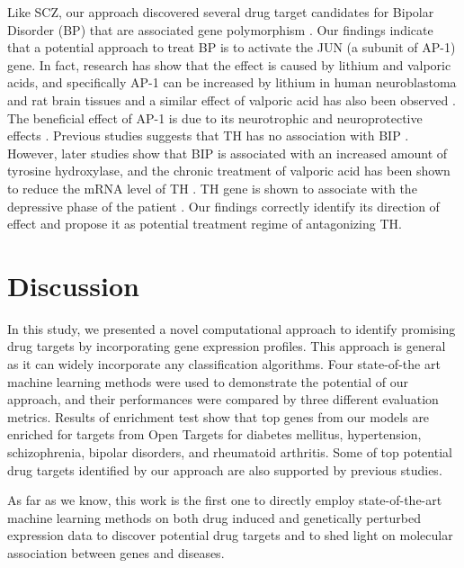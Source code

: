     Like SCZ, our approach discovered several drug target candidates for Bipolar Disorder (BP) that are associated gene polymorphism \cite{lee2013pathway,zhang2015functional,golimbet2014study}. Our findings indicate that a potential approach to treat BP is to activate the JUN (a subunit of AP-1) gene. In fact, research has show that the effect is caused by lithium and valporic acids, and specifically AP-1 can be increased by lithium in human neuroblastoma and rat brain tissues and a similar effect of valporic acid has also been observed \cite{yuan1998lithium,asghari1998differential,ozaki1997lithium}. The beneficial effect of AP-1 is due to its neurotrophic and neuroprotective effects \cite{machado2009role}. Previous studies suggests that TH has no association with BIP \cite{grassi1996no,turecki1997lack}. However, later studies show that BIP is associated with an increased amount of tyrosine hydroxylase, and the chronic treatment of valporic acid has been shown to reduce the mRNA level of TH \cite{pantazopoulos2004differences,muglia2002dopamine}. TH gene is shown to associate with the depressive phase of the patient \cite{muglia2002dopamine}. Our findings correctly identify its direction of effect and propose it as potential treatment regime of antagonizing TH.

\section{Discussion}
  In this study, we presented a novel computational approach to identify promising drug targets by incorporating gene expression profiles. This approach is general as it can widely incorporate any classification algorithms. Four state-of-the art machine learning methods were used to demonstrate the potential of our approach, and their performances were compared by three different evaluation metrics. Results of enrichment test show that top genes from our models are enriched for targets from Open Targets for diabetes mellitus, hypertension, schizophrenia, bipolar disorders, and rheumatoid arthritis. Some of top potential drug targets identified by our approach are also supported by previous studies. 

  As far as we know, this work is the first one to directly employ state-of-the-art machine learning methods on both drug induced and genetically perturbed expression data to discover potential drug targets and to shed light on molecular association between genes and diseases. 

